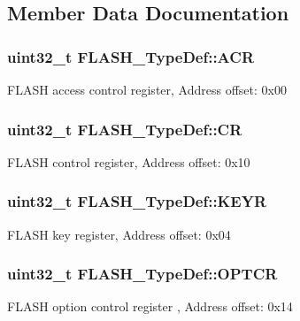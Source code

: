 \subsection{Member Data Documentation}
\subsubsection[{\texorpdfstring{A\+CR}{ACR}}]{ uint32\+\_\+t F\+L\+A\+S\+H\+\_\+\+Type\+Def\+::\+A\+CR}\hypertarget{struct_f_l_a_s_h___type_def_aaf432a8a8948613f4f66fcace5d2e5fe}{}\label{struct_f_l_a_s_h___type_def_aaf432a8a8948613f4f66fcace5d2e5fe}
F\+L\+A\+SH access control register, Address offset\+: 0x00 
\subsubsection[{\texorpdfstring{CR}{CR}}]{ uint32\+\_\+t F\+L\+A\+S\+H\+\_\+\+Type\+Def\+::\+CR}\hypertarget{struct_f_l_a_s_h___type_def_a7919306d0e032a855200420a57f884d7}{}\label{struct_f_l_a_s_h___type_def_a7919306d0e032a855200420a57f884d7}
F\+L\+A\+SH control register, Address offset\+: 0x10 
\subsubsection[{\texorpdfstring{K\+E\+YR}{KEYR}}]{ uint32\+\_\+t F\+L\+A\+S\+H\+\_\+\+Type\+Def\+::\+K\+E\+YR}\hypertarget{struct_f_l_a_s_h___type_def_a802e9a26a89b44decd2d32d97f729dd3}{}\label{struct_f_l_a_s_h___type_def_a802e9a26a89b44decd2d32d97f729dd3}
F\+L\+A\+SH key register, Address offset\+: 0x04 
\subsubsection[{\texorpdfstring{O\+P\+T\+CR}{OPTCR}}]{ uint32\+\_\+t F\+L\+A\+S\+H\+\_\+\+Type\+Def\+::\+O\+P\+T\+CR}\hypertarget{struct_f_l_a_s_h___type_def_a54026c3b5bc2059f1b187acb6c4817ac}{}\label{struct_f_l_a_s_h___type_def_a54026c3b5bc2059f1b187acb6c4817ac}
F\+L\+A\+SH option control register , Address offset\+: 0x14 
